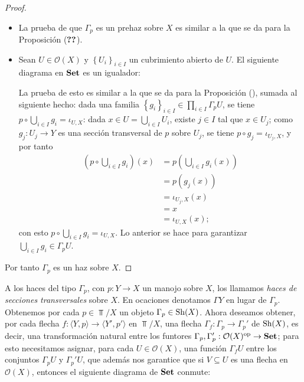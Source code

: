 \begin{proof}
   \begin{itemize}
      \item La prueba de que $\Gamma_p$ es un prehaz sobre $X$ es similar a la que se da para la Proposición ($\Ref{Prop:P1}$).
      \item Sean $U\in \mathcal{O}(X)$ y $\left\lbrace U_i\right\rbrace_{i\in I}$ un cubrimiento abierto de $U$. El siguiente diagrama en $\normalfont{\textbf{Set}}$ es un igualador:
         
         La prueba de esto es similar a la que se da para la Proposición (), sumada al siguiente hecho: dada una familia $\left\lbrace g_i\right\rbrace_{i\in I}\in \prod_{i\in I}\Gamma_p U$, se tiene $p\circ \bigcup_{i\in I} g_i=\iota_{U,X}$: dada $x\in U=\bigcup_{i\in I}U_i$, existe $j\in I$ tal que $x\in U_j$; como $g_j:U_j\to Y$ es una sección transversal de $p$ sobre $U_j$, se tiene $p\circ g_j = \iota_{U_j,X}$, y por tanto
         $$
         \begin{aligned}
            \left(p\circ \bigcup_{i\in I}g_i\right)(x)&=p\left( \bigcup_{i\in I}g_i(x)\right)\\
                                           &=p(g_j(x))\\
                                           &=\iota_{U_j,X}(x)\\
                                           &=x\\
                                           &=\iota_{U,X}(x);
         \end{aligned}
         $$
         con esto $p\circ \bigcup_{i\in I}g_i=\iota_{U,X}$. Lo anterior se hace para garantizar $\bigcup_{i\in I}g_i\in \Gamma_p U$.
   \end{itemize}
   Por tanto $\Gamma_p$ es un haz sobre $X$.
\end{proof}
A los haces del tipo $\Gamma_p$, con $p:Y\to X$ un manojo sobre $X$, los llamamos \textit{haces de secciones transversales} sobre $X$. En ocaciones denotamos $\Gamma Y$ en lugar de $\Gamma_p$. Obtenemos por cada $p\in\Top /X$ un objeto $\Gamma_p \in \normalfont{\text{Sh}} (X)$. Ahora deseamos obtener, por cada flecha $f:\langle Y,p \rangle \to \langle Y',p'\rangle$ en $\Top /X$, una flecha $\Gamma_f:\Gamma_p\to\Gamma_p'$ de $\normalfont{\text{Sh}}(X)$, es decir, una transformación natural entre los funtores $\Gamma_p,\Gamma_p':\mathcal{O}(X)^\text{op}\to\normalfont{\textbf{Set}}$; para esto necesitamos asignar, para cada $U\in\mathcal{O}(X)$, una función $\Gamma_f U$ entre los conjuntos $\Gamma_p U$ y $\Gamma_p' U$, que además nos garantice que si $V\subseteq U$ es una flecha en $\mathcal{O}(X)$, entonces el siguiente diagrama de $\normalfont{\textbf{Set}}$ conmute:
